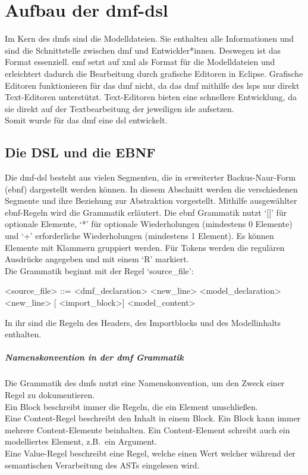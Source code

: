 \documentclass[./einleitung.tex]{subfiles}
\begin{document}
\section{Aufbau der \acrshort{dmf}-\acrshort{dsl}}
Im Kern des \acrshort{dmf}s sind die Modelldateien.
Sie enthalten alle Informationen und sind die Schnittstelle zwischen \acrshort{dmf} und Entwickler*innen.
Deswegen ist das Format essenziell.
\acrshort{emf} setzt auf \acrshort{xml} als Format für die Modelldateien und erleichtert dadurch die Bearbeitung durch grafische Editoren in Eclipse.
Grafische Editoren funktionieren für das \acrshort{dmf} nicht, da das \acrshort{dmf} mithilfe des \acrlong{lsp}s nur direkt Text-Editoren unterstützt.
Text-Editoren bieten eine schnellere Entwicklung, da sie direkt auf der Textbearbeitung der jeweiligen \acrshort{ide} aufsetzen. \\
Somit wurde für das \acrshort{dmf} eine \acrfull{dsl} entwickelt.
\subsection{Die DSL und die EBNF}
Die \acrshort{dmf}-\acrshort{dsl} besteht aus vielen Segmenten, die in erweiterter Backus-Naur-Form (\acrshort{ebnf}) dargestellt werden können.
In diesem Abschnitt werden die verschiedenen Segmente und ihre Beziehung zur Abstraktion vorgestellt.
Mithilfe ausgewählter \acrshort{ebnf}-Regeln wird die Grammatik erläutert.\newline \newline
Die \acrshort{ebnf} Grammatik nutzt `[]' für optionale Elemente, `*' für optionale Wiederholungen (mindestens 0 Elemente) und `+' erforderliche Wiederholungen (mindestens 1 Element).
Es können Elemente mit Klammern gruppiert werden.
Für Tokens werden die regulären Ausdrücke angegeben und mit einem `R' markiert.\\

Die Grammatik beginnt mit der Regel `source\_file':
\begin{grammar}
<source\_file> ::= <dmf_declaration> <new_line> <model_declaration> <new_line> [ <import_block>] <model_content>
\end{grammar}
In ihr sind die Regeln des Headers, des Importblocks und des Modellinhalts enthalten.

\subparagraph{Namenskonvention in der \acrshort{dmf} Grammatik}
Die Grammatik des \acrshort{dmf}s nutzt eine Namenskonvention, um den Zweck einer Regel zu dokumentieren.\\
Ein Block beschreibt immer die Regeln, die ein Element umschließen. \\
Eine Content-Regel beschreibt den Inhalt in einem Block.
Ein Block kann immer mehrere Content-Elemente beinhalten.
Ein Content-Element schreibt auch ein modelliertes Element, z.B.\ ein Argument. \\
Eine Value-Regel beschreibt eine Regel, welche einen Wert welcher während der semantischen Verarbeitung des ASTs eingelesen wird.
\end{document}
